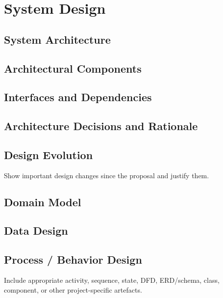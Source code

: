\chapter{System Design}
\section{System Architecture}
\section{Architectural Components}
\section{Interfaces and Dependencies}
\section{Architecture Decisions and Rationale}
\section{Design Evolution}
Show important design changes since the proposal and justify them.
\section{Domain Model}
\section{Data Design}
\section{Process / Behavior Design}
Include appropriate activity, sequence, state, DFD, ERD/schema, class, component, or other project-specific artefacts.
